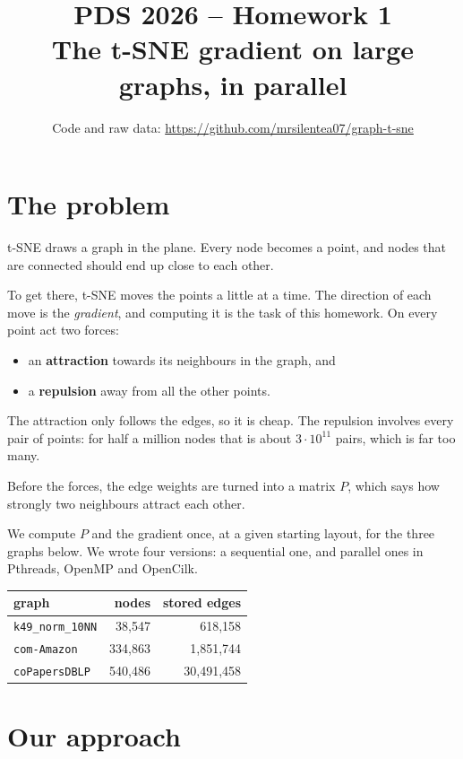 \documentclass[11pt,a4paper]{article}
\title{PDS 2026 -- Homework 1\\[2pt]
\large The t-SNE gradient on large graphs, in parallel}
\author{Code and raw data:
\url{https://github.com/mrsilentea07/graph-t-sne}}
\date{}
\newcommand{\code}[1]{\texttt{#1}}
\begin{document}
\maketitle

\section{The problem}

t-SNE draws a graph in the plane. Every node becomes a point, and nodes
that are connected should end up close to each other.

To get there, t-SNE moves the points a little at a time. The direction of
each move is the \emph{gradient}, and computing it is the task of this
homework. On every point act two forces:
\begin{itemize}
  \item an \textbf{attraction} towards its neighbours in the graph, and
  \item a \textbf{repulsion} away from all the other points.
\end{itemize}

The attraction only follows the edges, so it is cheap. The repulsion
involves every pair of points: for half a million nodes that is about
$3\cdot10^{11}$ pairs, which is far too many.

Before the forces, the edge weights are turned into a matrix $P$, which
says how strongly two neighbours attract each other.

We compute $P$ and the gradient once, at a given starting layout, for the
three graphs below. We wrote four versions: a sequential one, and parallel
ones in Pthreads, OpenMP and OpenCilk.

\begin{center}
\begin{tabular}{lrr}
\toprule
graph & nodes & stored edges \\
\midrule
\code{k49\_norm\_10NN} & 38{,}547  & 618{,}158 \\
\code{com-Amazon}      & 334{,}863 & 1{,}851{,}744 \\
\code{coPapersDBLP}    & 540{,}486 & 30{,}491{,}458 \\
\bottomrule
\end{tabular}
\end{center}

\section{Our approach}
\end{document}
